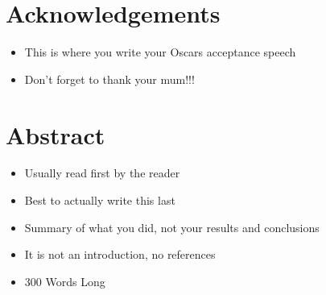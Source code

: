 \section*{Acknowledgements}

\begin{itemize}
    \item This is where you write your Oscars acceptance speech
    \item Don't forget to thank your mum!!!
\end{itemize}

\newpage

\section*{Abstract}

\begin{itemize}
    \item Usually read first by the reader
    \item Best to actually write this last
    \item Summary of what you did, not your results and conclusions
    \item It is not an introduction, no references
    \item 300 Words Long
\end{itemize}
